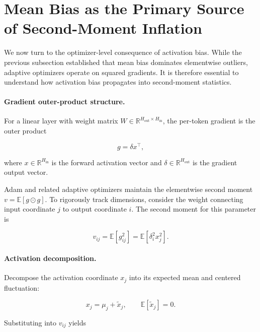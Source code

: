 \section{Mean Bias as the Primary Source of Second-Moment Inflation}
\label{subsec:mean_second_moment}

We now turn to the optimizer-level consequence of activation bias.
While the previous subsection established that mean bias dominates
elementwise outliers, adaptive optimizers operate on squared gradients.
It is therefore essential to understand how activation bias propagates
into second-moment statistics.

\paragraph{Gradient outer-product structure.}

For a linear layer with weight matrix $W \in \mathbb{R}^{H_{\text{out}}\times H_{\text{in}}}$,
the per-token gradient is the outer product

\begin{equation}
g = \delta x^\top,
\end{equation}

where $x \in \mathbb{R}^{H_{\text{in}}}$ is the forward activation vector
and $\delta \in \mathbb{R}^{H_{\text{out}}}$ is the gradient output vector.

Adam and related adaptive optimizers maintain the elementwise second moment $v = \mathbb{E}[g \odot g]$.
To rigorously track dimensions, consider the weight connecting input coordinate $j$ to output coordinate $i$. The second moment for this parameter is

\begin{equation}
v_{ij} = \mathbb{E}[g_{ij}^2]
   = \mathbb{E}[\delta_i^2 x_j^2].
\end{equation}

\paragraph{Activation decomposition.}

Decompose the activation coordinate $x_j$ into its expected mean and centered fluctuation:

\begin{equation}
x_j = \mu_j + \tilde{x}_j,
\qquad
\mathbb{E}[\tilde{x}_j] = 0.
\end{equation}

Substituting into $v_{ij}$ yields

